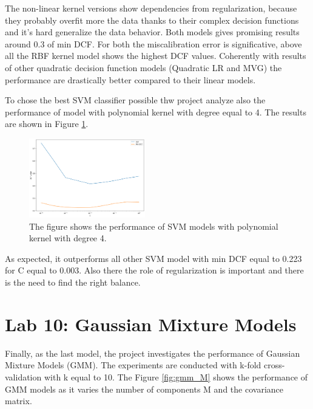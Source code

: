 \documentclass{article}
\begin{document}
The non-linear kernel versions show dependencies from regularization, because they probably overfit more the data thanks to their complex decision functions and it's hard generalize the data behavior. Both models gives promising results around 0.3 of min DCF. For both the miscalibration error is significative, above all the RBF kernel model shows the highest DCF values. Coherently with results of other quadratic decision function models (Quadratic LR and MVG) the performance are drastically better compared to their linear models.

To chose the best SVM classifier possible thw project analyze also the performance of model with polynomial kernel with degree equal to 4. The results are shown in Figure \ref{fig:svm_C_poly_4}.

\begin{figure}[ht]
    \centering
    \includegraphics[width=0.45\textwidth]{images/svm_C_poly_4.png}
    \caption{The figure shows the performance of SVM models with polynomial kernel with degree 4.}
    \label{fig:svm_C_poly_4}
\end{figure}

As expected, it outperforms all other SVM model with min DCF equal to 0.223 for C equal to 0.003. Also there the role of regularization is important and there is the need to find the right balance.

\section{Lab 10: Gaussian Mixture Models}
\label{sec:gmm}
Finally, as the last model, the project investigates the performance of Gaussian Mixture Models (GMM). The experiments are conducted with k-fold cross-validation with k equal to 10. The Figure \ref{fig:gmm_M} shows the performance of GMM models as it varies the number of components M and the covariance matrix.
\end{document}

